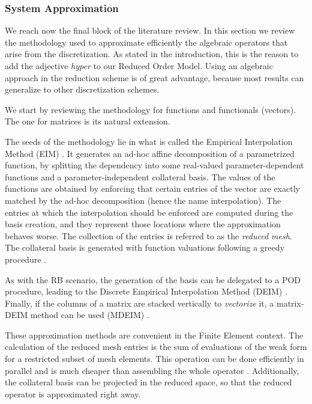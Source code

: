 \documentclass[literature_review.tex]{subfiles}
\begin{document}
\subsubsection{System Approximation}
We reach now the final block of the literature review.
In this section we review the methodology used to approximate efficiently 
the algebraic operators that arise from the discretization.
As stated in the introduction, this is the reason to add the adjective \textit{hyper} 
to our Reduced Order Model.
Using an algebraic approach in the reduction scheme is of great advantage,
because most results can generalize to other discretization schemes.

We start by reviewing the methodology for functions and functionals (vectors).
The one for matrices is its natural extension.

The seeds of the methodology lie in what is called the 
Empirical Interpolation Method (EIM)
\cite{barrault:hal-00021702,
Casenave2014,
Nguyen2008}.
It generates an ad-hoc affine decomposition of a parametrized function,
by splitting the dependency into some real-valued parameter-dependent functions 
and a parameter-independent collateral basis.
The values of the functions are obtained by 
enforcing that certain entries of the vector are 
exactly matched by the ad-hoc decomposition
(hence the name interpolation).
The entries at which the interpolation should be enforced 
are computed during the basis creation,
and they represent those locations where the approximation behaves worse.
The collection of the entries is referred to as the \textit{reduced mesh}.
The collateral basis is generated with function valuations following
a greedy procedure 
\cite{Hesthaven2014}.

As with the RB scenario, 
the generation of the basis can be delegated to a POD procedure,
leading to the Discrete Empirical Interpolation Method (DEIM)
\cite{2010_nonlinearModelReductionDeim_chaturantabut,
2018_podDeimReducedOrderModelDeformingMeshAeroelasticApplications_Donfrancesco}.
Finally, if the columns of a matrix are stacked vertically to \textit{vectorize} it,
a matrix-DEIM method can be used (MDEIM)
\cite{2012_deimAPosterioriNonlinear_DinamicalSystems,
2015_efficientModelReductionParametrizedSystemsMatrixDeim_Negri,
mdeim_elasticity_problems}.

These approximation methods are convenient
in the Finite Element context.
The calculation of the reduced mesh entries is the sum of evaluations of the 
weak form for a restricted subset of mesh elements.
This operation can be done efficiently in parallel and 
is much cheaper than assembling the whole operator 
\cite{Santo_Manzoni_2019}.
Additionally, the collateral basis can be projected in the reduced space,
so that the reduced operator is approximated right away. 
\end{document}
